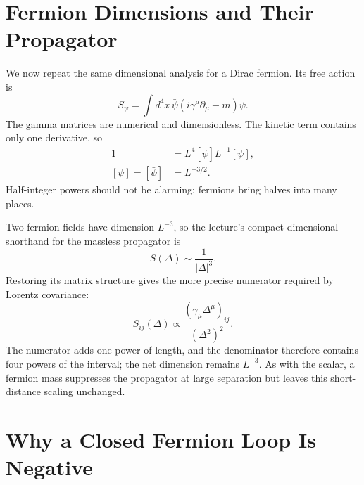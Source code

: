 \section{Fermion Dimensions and Their Propagator}

We now repeat the same dimensional analysis for a Dirac fermion. Its free action is
\begin{equation}
S_\psi=\int d^4x\,
\bar\psi\left(i\gamma^\mu\partial_\mu-m\right)\psi.
\end{equation}
The gamma matrices are numerical and dimensionless. The kinetic term contains only one derivative, so
\begin{align}
1
&=L^4[\bar\psi]L^{-1}[\psi],\\
[\psi]=[\bar\psi]&=L^{-3/2}.
\end{align}
Half-integer powers should not be alarming; fermions bring halves into many places.

\begin{classroomqa}
\end{classroomqa}

Two fermion fields have dimension \(L^{-3}\), so the lecture's compact dimensional shorthand for the massless propagator is
\begin{equation}
S(\Delta)\sim\frac{1}{|\Delta|^3}.
\end{equation}
Restoring its matrix structure gives the more precise numerator required by Lorentz covariance:
\begin{equation}
S_{ij}(\Delta)
\propto
\frac{\left(\gamma_\mu\Delta^\mu\right)_{ij}}
{\left(\Delta^2\right)^2}.
\end{equation}
The numerator adds one power of length, and the denominator therefore contains four powers of the interval; the net dimension remains \(L^{-3}\). As with the scalar, a fermion mass suppresses the propagator at large separation but leaves this short-distance scaling unchanged.

\section{Why a Closed Fermion Loop Is Negative}

